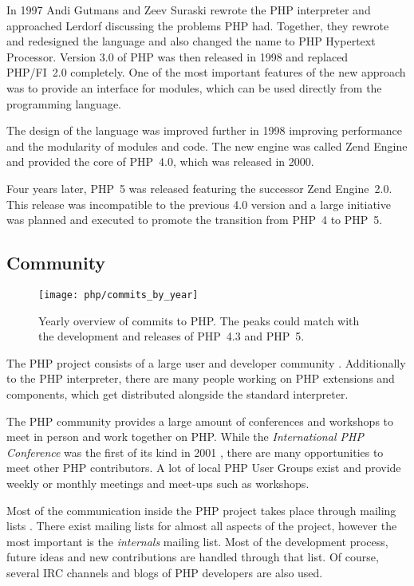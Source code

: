 In 1997 Andi Gutmans and Zeev Suraski rewrote the PHP interpreter and
approached Lerdorf discussing the problems PHP had. Together, they rewrote and
redesigned the language and also changed the name to PHP Hypertext Processor.
Version 3.0 of PHP was then released in 1998 and replaced PHP/FI~2.0
completely. One of the most important features of the new approach was to
provide an interface for modules, which can be used directly from the
programming language.

The design of the language was improved further in 1998 improving performance
and the modularity of modules and code. The new engine was called Zend Engine
and provided the core of PHP~4.0, which was released in 2000.

Four years later, PHP~5 was released featuring the successor Zend Engine~2.0.
This release was incompatible to the previous 4.0 version and a large
initiative was planned and executed to promote the transition from PHP~4 to
PHP~5.


\subsection{Community} %

\begin{figure}[htbp]
  \centering
  \texttt{[image: php/commits\_by\_year]}
  \caption[Commits by Year, PHP]
  {Yearly overview of commits to PHP. The peaks could match with the
    development and releases of PHP~4.3 and PHP~5.}
\end{figure}

The PHP project consists of a large user and developer community
\cite{Magnusson2010}. Additionally to the PHP interpreter, there are many
people working on PHP extensions and components, which get distributed
alongside the standard interpreter.

The PHP community provides a large amount of conferences and workshops to meet
in person and work together on PHP. While the \emph{International PHP
Conference} was the first of its kind in 2001 \cite{PHPConferences}, there are
many opportunities to meet other PHP contributors. A lot of local PHP User
Groups exist and provide weekly or monthly meetings and meet-ups such as
workshops.

Most of the communication inside the PHP project takes place through mailing
lists \cite{Magnusson2010}. There exist mailing lists for almost all aspects of
the project, however the most important is the \emph{internals} mailing list.
Most of the development process, future ideas and new contributions are handled
through that list. Of course, several \ac{IRC} channels and blogs of PHP
developers are also used.

